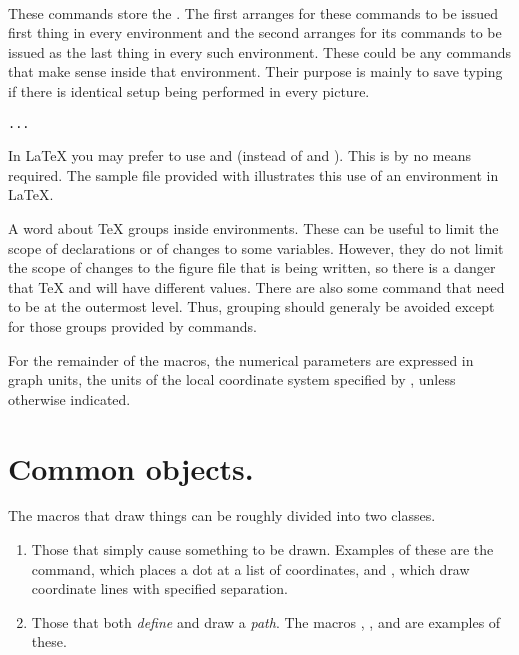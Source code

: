 \documentclass[letterpaper]{article}
\begin{document}
\begin{cd}
\\
%
%
%
\end{cd}

These commands store the . The first arranges for these
commands to be issued first thing in every  environment and
the second arranges for its commands to be issued as the last thing in
every such environment. These could be any commands that make sense
inside that environment. Their purpose is mainly to save typing if there
is identical setup being performed in every picture.

\begin{cd}
\texttt{...}%
\end{cd}

In \LaTeX{} you may prefer to use  and
 (instead of  and ). This is
by no means required. The sample file  provided
with \mfp{} illustrates this use of an  environment in
\LaTeX{}.

\medskip
A word about \TeX{} groups inside  environments. These can be
useful to limit the scope of declarations or of changes to some
variables. However, they do not limit the scope of changes to the figure
file that is being written, so there is a danger that \TeX{} and \MF{}
will have different values. There are also some \mfp{} command that need
to be at the outermost level. Thus, grouping should generaly be avoided
except for those groups provided by \mfp{} commands.

\medskip
For the remainder of the macros, the numerical parameters are expressed
in graph units, the units of the local coordinate system specified by
, unless otherwise indicated.

\section{Common objects.}\label{figures}

The \mfp{} macros that draw things can be roughly divided into two
classes.
\begin{enumerate}
  \item Those that simply cause something to be drawn. Examples of these
    are the  command, which places a dot at a list of
    coordinates, and , which draw coordinate lines with
    specified separation.
  \item Those that both \emph{define} and draw a \emph{path}. The macros
     , , and  are examples of these.
\end{enumerate}
\end{document}
